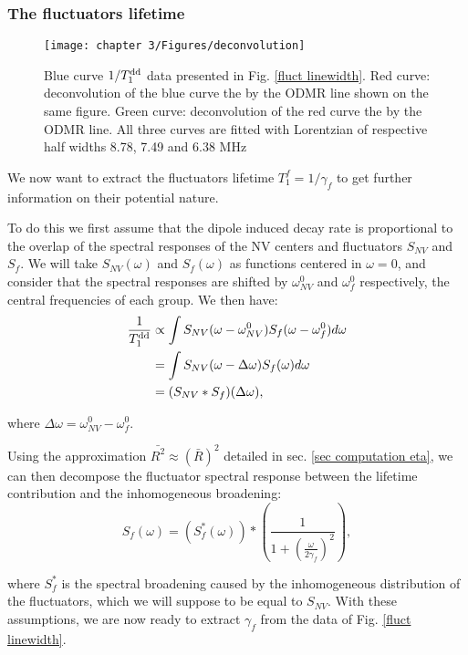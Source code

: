 \documentclass[a4paper,11pt]{report}
\begin{document}
\begin{refsection}
\subsubsection{The fluctuators lifetime}
\begin{figure}[h]
\centering
\texttt{[image: chapter 3/Figures/deconvolution]}
\caption{Blue curve $1/T_1^{\rm dd}$ data presented in Fig. \ref{fluct linewidth}. Red curve: deconvolution of the blue curve the  by the ODMR line shown on the same figure. Green curve: deconvolution of the red curve the  by the ODMR line. All three curves are fitted with Lorentzian of respective half widths 8.78, 7.49 and 6.38 MHz}
\label{deconvolution}
\end{figure}

We now want to extract the fluctuators lifetime $T_1^f=1/\gamma_f$ to get further information on their potential nature. 

To do this we first assume that the dipole induced decay rate is proportional to the overlap of the spectral responses of the NV centers and fluctuators $S_{NV}$ and $S_f$. We will take $S_{NV}( \omega)$ and $S_{f}( \omega)$ as functions centered in $\omega=0$, and consider that the spectral responses are shifted by $\omega^0_{NV}$ and $\omega^0_{f}$ respectively, the central frequencies of each group. We then have:
\begin{align*}
\frac{1}{T_1^{\rm dd}} &\propto \int S_{NV} (\omega-\omega_{NV}^0) S_f (\omega-\omega_{f}^0) d\omega \\
&= \int S_{NV} (\omega-\Delta \omega) S_f (\omega)
 d\omega \\
 &= (S_{NV}*S_{f})(\Delta \omega),
\end{align*}

where $\Delta \omega=\omega_{NV}^0-\omega_{f}^0$.

Using the approximation $\bar {R ^2} \approx (\bar{R})^2$ detailed in sec. \ref{sec computation eta}, we can then decompose the fluctuator spectral response between the lifetime contribution and the inhomogeneous broadening:
\begin{equation}
S_{f}(\omega)=\left(S_f^*(\omega)\right)*\left(\frac{1}{1+\left(\frac{\omega}{2 \gamma_f}\right)^2} \right),
\end{equation}

where $S_f^*$ is the spectral broadening caused by the inhomogeneous distribution of the fluctuators, which we will suppose to be equal to $S_{NV}$. With these assumptions, we are now ready to extract $\gamma_f$ from the data of Fig. \ref{fluct linewidth}.


\end{refsection}
\end{document}
